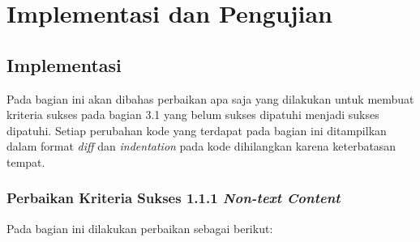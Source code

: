 \chapter{Implementasi dan Pengujian}
\label{chap:implementasi_dan_pengujian}

\section{Implementasi}
\label{sec:implementasi}
Pada bagian ini akan dibahas perbaikan apa saja yang dilakukan untuk membuat kriteria sukses pada bagian 3.1
yang belum sukses dipatuhi menjadi sukses dipatuhi. Setiap perubahan kode yang terdapat pada bagian ini ditampilkan dalam format \textit{diff} dan \textit{indentation} pada kode dihilangkan karena keterbatasan tempat. 

\subsection{Perbaikan Kriteria Sukses 1.1.1 \textit{Non-text Content}}
\label{subsec:perbaikan_kriteria_sukses_1.1.1}
Pada bagian ini dilakukan perbaikan sebagai berikut:

